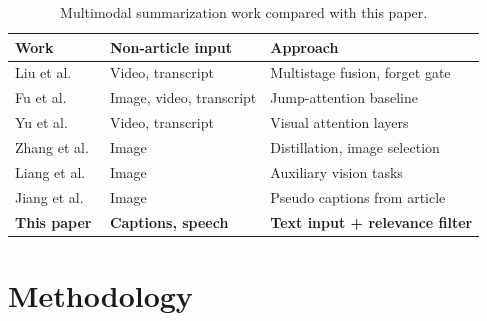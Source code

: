 \documentclass[conference]{IEEEtran}
\begin{document}
\begin{table}[t]
\caption{Multimodal summarization work compared with this paper.}
\label{tab:related}
\centering
\footnotesize
\setlength{\tabcolsep}{3pt}
\begin{tabular}{lll}
\toprule
Work & Non-article input & Approach \\
\midrule
Liu et al.~\cite{liu2020multistage} & Video, transcript & Multistage fusion, forget gate \\
Fu et al.~\cite{fu2021mmavs} & Image, video, transcript & Jump-attention baseline \\
Yu et al.~\cite{yu2021vgbart} & Video, transcript & Visual attention layers \\
Zhang et al.~\cite{zhang2022unims} & Image & Distillation, image selection \\
Liang et al.~\cite{liang2023sov} & Image & Auxiliary vision tasks \\
Jiang et al.~\cite{jiang2023sita} & Image & Pseudo captions from article \\
\textbf{This paper} & \textbf{Captions, speech} & \textbf{Text input + relevance filter} \\
\bottomrule
\end{tabular}
\end{table}

\section{Methodology}
\label{sec:method}
\end{document}
